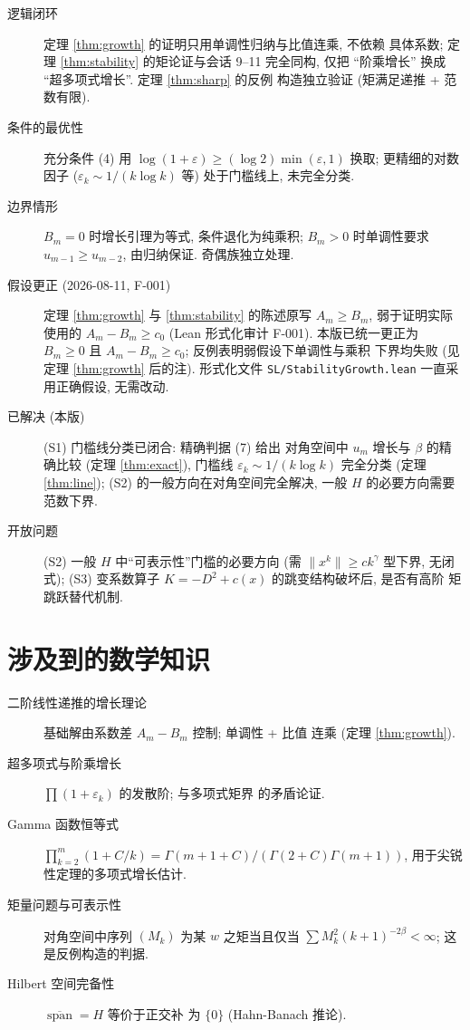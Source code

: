 \documentclass[UTF8]{ctexart}
\begin{document}
\begin{description}
	\item[逻辑闭环] 定理 \ref{thm:growth} 的证明只用单调性归纳与比值连乘, 不依赖
		具体系数; 定理 \ref{thm:stability} 的矩论证与会话 9--11 完全同构,
		仅把 ``阶乘增长'' 换成 ``超多项式增长''. 定理 \ref{thm:sharp} 的反例
		构造独立验证 (矩满足递推 + 范数有限).
	\item[条件的最优性] 充分条件 (4) 用 $\log(1+\varepsilon) \geq
		(\log 2)\min(\varepsilon,1)$ 换取; 更精细的对数因子
		($\varepsilon_k \sim 1/(k\log k)$ 等) 处于门槛线上, 未完全分类.
	\item[边界情形] $B_m = 0$ 时增长引理为等式, 条件退化为纯乘积; $B_m > 0$
		时单调性要求 $u_{m-1} \geq u_{m-2}$, 由归纳保证. 奇偶族独立处理.
	\item[假设更正 (2026-08-11, F-001)] 定理 \ref{thm:growth} 与
		\ref{thm:stability} 的陈述原写 $A_m \geq B_m$, 弱于证明实际使用的
		$A_m - B_m \geq c_0$ (Lean 形式化审计 F-001). 本版已统一更正为
		$B_m \geq 0$ 且 $A_m - B_m \geq c_0$; 反例表明弱假设下单调性与乘积
		下界均失败 (见定理 \ref{thm:growth} 后的注). 形式化文件
		\texttt{SL/StabilityGrowth.lean} 一直采用正确假设, 无需改动.
	\item[已解决 (本版)] (S1) 门槛线分类已闭合: 精确判据 (7) 给出
		对角空间中 $u_m$ 增长与 $\beta$ 的精确比较 (定理 \ref{thm:exact}),
		门槛线 $\varepsilon_k \sim 1/(k\log k)$ 完全分类
		(定理 \ref{thm:line}); (S2) 的一般方向在对角空间完全解决,
		一般 $H$ 的必要方向需要范数下界.
	\item[开放问题] (S2) 一般 $H$ 中``可表示性''门槛的必要方向
		(需 $\|x^k\| \geq c k^\gamma$ 型下界, 无闭式);
		(S3) 变系数算子 $K = -D^2 + c(x)$ 的跳变结构破坏后, 是否有高阶
		矩跳跃替代机制.
\end{description}

\section{涉及到的数学知识}

\begin{description}
	\item[二阶线性递推的增长理论] 基础解由系数差 $A_m - B_m$ 控制; 单调性 + 比值
		连乘 (定理 \ref{thm:growth}).
	\item[超多项式与阶乘增长] $\prod(1+\varepsilon_k)$ 的发散阶; 与多项式矩界
		的矛盾论证.
	\item[Gamma 函数恒等式] $\prod_{k=2}^m (1+C/k) = \Gamma(m+1+C)/(\Gamma(2+C)\Gamma(m+1))$,
		用于尖锐性定理的多项式增长估计.
	\item[矩量问题与可表示性] 对角空间中序列 $(M_k)$ 为某 $w$ 之矩当且仅当
		$\sum M_k^2(k+1)^{-2\beta} < \infty$; 这是反例构造的判据.
	\item[Hilbert 空间完备性] $\overline{\operatorname{span}} = H$ 等价于正交补
		为 $\{0\}$ (Hahn-Banach 推论).
\end{description}
\end{document}
